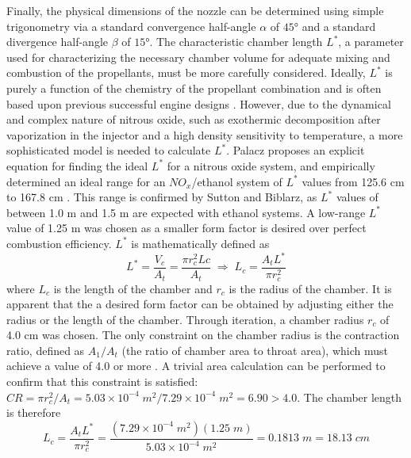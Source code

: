 \documentclass[9pt]{article} %
\numberwithin{equation}{section} %
\begin{document}
Finally, the physical dimensions of the nozzle can be determined using simple trigonometry via a standard convergence half-angle $\alpha$ of $\ang{45}$ and a standard divergence half-angle $\beta$ of $\ang{15}$. The characteristic chamber length $L^{*}$, a parameter used for characterizing the necessary chamber volume for adequate mixing and combustion of the propellants, must be more carefully considered. Ideally, $L^{*}$ is purely a function of the chemistry of the propellant combination and is often based upon previous successful engine designs \cite{rpe}. However, due to the dynamical and complex nature of nitrous oxide, such as exothermic decomposition after vaporization in the injector and a high density sensitivity to temperature, a more sophisticated model is needed to calculate $L^{*}$. Palacz proposes an explicit equation for finding the ideal $L^{*}$ for a nitrous oxide system, and empirically determined an ideal range for an $NO_{x}$/ethanol system of $L^{*}$ values from 125.6 cm to 167.8 cm \cite{nitrous-paper}. This range is confirmed by Sutton and Biblarz, as $L^{*}$ values of between 1.0 m and 1.5 m are expected with ethanol systems. A low-range $L^{*}$ value of 1.25 m was chosen as a smaller form factor is desired over perfect combustion efficiency. $L^{*}$ is mathematically defined as
\begin{equation} \label{eq:l_star}
L^{*} = \frac{V_{c}}{A_{t}} = \frac{\pi r_{c}^{2} L{c}}{A_{t}} \; \Longrightarrow \; L_{c} = \frac{A_{t} L^{*}}{\pi r_{c}^{2}}
\end{equation}
where $L_{c}$ is the length of the chamber and $r_{c}$ is the radius of the chamber. It is apparent that the a desired form factor can be obtained by adjusting either the radius or the length of the chamber. Through iteration, a chamber radius $r_{c}$ of 4.0 cm was chosen. The only constraint on the chamber radius is the contraction ratio, defined as $A_{1}/A_{t}$ (the ratio of chamber area to throat area), which must achieve a value of 4.0 or more \cite{rpe}. A trivial area calculation can be performed to confirm that this constraint is satisfied: $CR =  \pi r_{c}^{2}/A_{t} = 5.03 \times 10^{-4} \; m^{2} / 7.29 \times 10^{-4} \; m^{2} = 6.90 > 4.0$. The chamber length is therefore
\begin{equation*}
L_{c} = \frac{A_{t} L^{*}}{\pi r_{c}^{2}} = \frac{(7.29 \times 10^{-4} \; m^{2})(1.25 \; m)}{5.03 \times 10^{-4} \; m^{2}} = 0.1813 \; m = 18.13 \; cm
\end{equation*}
\end{document}
